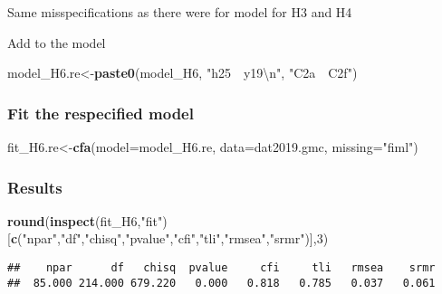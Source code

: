 \documentclass[
]{article}
\newenvironment{Shaded}{\begin{snugshade}}{\end{snugshade}}
\newcommand{\CharTok}[1]{\textcolor[rgb]{0.31,0.60,0.02}{#1}}
\newcommand{\DataTypeTok}[1]{\textcolor[rgb]{0.13,0.29,0.53}{#1}}
\newcommand{\DecValTok}[1]{\textcolor[rgb]{0.00,0.00,0.81}{#1}}
\newcommand{\KeywordTok}[1]{\textcolor[rgb]{0.13,0.29,0.53}{\textbf{#1}}}
\newcommand{\NormalTok}[1]{#1}
\newcommand{\StringTok}[1]{\textcolor[rgb]{0.31,0.60,0.02}{#1}}
\begin{document}
Same misspecifications as there were for model for H3 and H4

Add to the model

\begin{Shaded}
\begin{Highlighting}[]
\NormalTok{model_H6.re<-}\KeywordTok{paste0}\NormalTok{(model_H6,}
                      \StringTok{"h25~~y19}\CharTok{\textbackslash{}n}\StringTok{"}\NormalTok{,}
                    \StringTok{"C2a~~C2f"}\NormalTok{)}
\end{Highlighting}
\end{Shaded}

\hypertarget{fit-the-respecified-model-1}{%
\subsubsection{Fit the respecified
model}\label{fit-the-respecified-model-1}}

\begin{Shaded}
\begin{Highlighting}[]
\NormalTok{fit_H6.re<-}\KeywordTok{cfa}\NormalTok{(}\DataTypeTok{model=}\NormalTok{model_H6.re,}
              \DataTypeTok{data=}\NormalTok{dat2019.gmc,}
              \DataTypeTok{missing=}\StringTok{"fiml"}\NormalTok{)}
\end{Highlighting}
\end{Shaded}

\hypertarget{results-3}{%
\subsubsection{Results}\label{results-3}}

\begin{Shaded}
\begin{Highlighting}[]
\KeywordTok{round}\NormalTok{(}\KeywordTok{inspect}\NormalTok{(fit_H6,}\StringTok{"fit"}\NormalTok{)}
\NormalTok{      [}\KeywordTok{c}\NormalTok{(}\StringTok{"npar"}\NormalTok{,}\StringTok{"df"}\NormalTok{,}\StringTok{"chisq"}\NormalTok{,}\StringTok{"pvalue"}\NormalTok{,}\StringTok{"cfi"}\NormalTok{,}\StringTok{"tli"}\NormalTok{,}\StringTok{"rmsea"}\NormalTok{,}\StringTok{"srmr"}\NormalTok{)],}\DecValTok{3}\NormalTok{)}
\end{Highlighting}
\end{Shaded}

\begin{verbatim}
##    npar      df   chisq  pvalue     cfi     tli   rmsea    srmr 
##  85.000 214.000 679.220   0.000   0.818   0.785   0.037   0.061
\end{verbatim}
\end{document}

